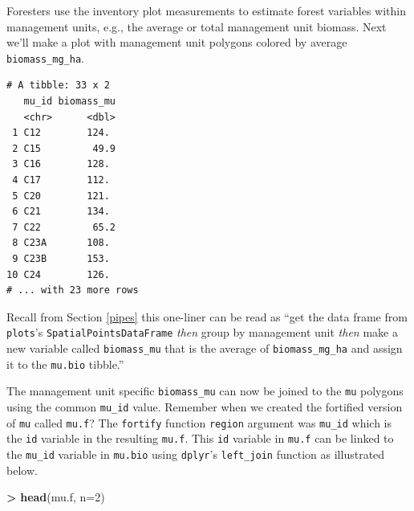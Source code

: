 \documentclass[]{krantz}
\makeatletter
\newenvironment{Shaded}{\begin{snugshade}}{\end{snugshade}}
\newcommand{\KeywordTok}[1]{\textcolor[rgb]{0.27,0.27,0.27}{\textbf{#1}}}
\newcommand{\DataTypeTok}[1]{\textcolor[rgb]{0.27,0.27,0.27}{#1}}
\newcommand{\DecValTok}[1]{\textcolor[rgb]{0.06,0.06,0.06}{#1}}
\newcommand{\StringTok}[1]{\textcolor[rgb]{0.5,0.5,0.5}{#1}}
\newcommand{\OperatorTok}[1]{\textcolor[rgb]{0.43,0.43,0.43}{\textbf{#1}}}
\newcommand{\NormalTok}[1]{#1}
\newenvironment{kframe}{%
\medskip{}
\setlength{\fboxsep}{.8em}
 \def\at@end@of@kframe{}%
 \ifinner\ifhmode%
  \def\at@end@of@kframe{\end{minipage}}%
  \begin{minipage}{\columnwidth}%
 \fi\fi%
 \def\FrameCommand##1{\hskip\@totalleftmargin \hskip-\fboxsep
 \colorbox{shadecolor}{##1}\hskip-\fboxsep
     \hskip-\linewidth \hskip-\@totalleftmargin \hskip\columnwidth}%
 \MakeFramed {\advance\hsize-\width
   \@totalleftmargin\z@ \linewidth\hsize
   \@setminipage}}%
 {\par\unskip\endMakeFramed%
 \at@end@of@kframe}
\renewenvironment{Shaded}{\begin{kframe}}{\end{kframe}}
\makeatother
\begin{document}
Foresters use the inventory plot measurements to estimate forest
variables within management units, e.g., the average or total management
unit biomass. Next we'll make a plot with management unit polygons
colored by average \texttt{biomass\_mg\_ha}.

\begin{Shaded}
\end{Shaded}

\begin{verbatim}
# A tibble: 33 x 2
   mu_id biomass_mu
   <chr>      <dbl>
 1 C12        124. 
 2 C15         49.9
 3 C16        128. 
 4 C17        112. 
 5 C20        121. 
 6 C21        134. 
 7 C22         65.2
 8 C23A       108. 
 9 C23B       153. 
10 C24        126. 
# ... with 23 more rows
\end{verbatim}

Recall from Section \ref{pipes} this one-liner can be read as ``get the
data frame from \texttt{plots}'s \texttt{SpatialPointsDataFrame}
\emph{then} group by management unit \emph{then} make a new variable
called \texttt{biomass\_mu} that is the average of
\texttt{biomass\_mg\_ha} and assign it to the \texttt{mu.bio} tibble.''

The management unit specific \texttt{biomass\_mu} can now be joined to
the \texttt{mu} polygons using the common \texttt{mu\_id} value.
Remember when we created the fortified version of \texttt{mu} called
\texttt{mu.f}? The \texttt{fortify} function \texttt{region} argument
was \texttt{mu\_id} which is the \texttt{id} variable in the resulting
\texttt{mu.f}. This \texttt{id} variable in \texttt{mu.f} can be linked
to the \texttt{mu\_id} variable in \texttt{mu.bio} using
\texttt{dplyr}'s \texttt{left\_join} function as illustrated below.

\begin{Shaded}
\begin{Highlighting}[]
\OperatorTok{>}\StringTok{ }\KeywordTok{head}\NormalTok{(mu.f, }\DataTypeTok{n=}\DecValTok{2}\NormalTok{)}
\end{Highlighting}
\end{Shaded}
\end{document}

